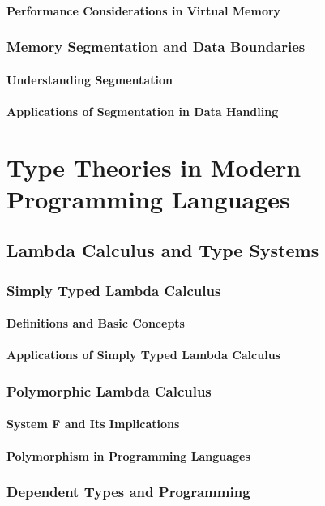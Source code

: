 \documentclass[12pt, oneside]{book}
\begin{document}
\subsubsection{Performance Considerations in Virtual Memory}
\subsection{Memory Segmentation and Data Boundaries}
\subsubsection{Understanding Segmentation}
\subsubsection{Applications of Segmentation in Data Handling}

\chapter{Type Theories in Modern Programming Languages}
\section{Lambda Calculus and Type Systems}
\subsection{Simply Typed Lambda Calculus}
\subsubsection{Definitions and Basic Concepts}
\subsubsection{Applications of Simply Typed Lambda Calculus}
\subsection{Polymorphic Lambda Calculus}
\subsubsection{System F and Its Implications}
\subsubsection{Polymorphism in Programming Languages}
\subsection{Dependent Types and Programming}
\end{document}
